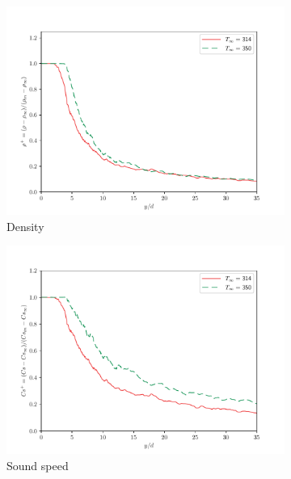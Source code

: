\begin{figure}[H]
\begin{center}
\begin{subfigure}{0.45\textwidth}
	\includegraphics[scale=.45]{figures/Plots/centerline/rho_centerline_scaled.pdf}
	\caption{Density} \label{noniso_rho_centerline_1}
\end{subfigure}
\begin{subfigure}{0.45\textwidth}
	\includegraphics[scale=.45]{figures/Plots/centerline/Cs_centerline_scaled.pdf}
	\caption{Sound speed} \label{noniso_Cs_centerline_1}
\end{subfigure}
\vfill
\begin{subfigure}{0.45\textwidth}

\end{subfigure}
\end{center}
\end{figure}
